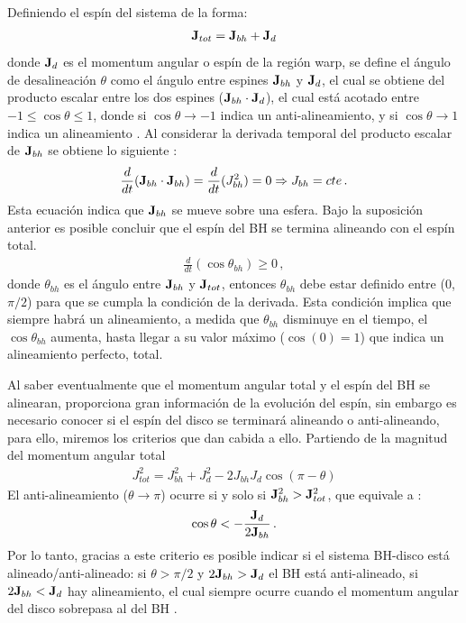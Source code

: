 Definiendo el espín del sistema de la forma:
\begin{align}
	{\bf{J}}_{tot}= {\bf{J}}_{bh}+{\bf{J}}_{d}
\end{align}
donde ${\bf{J}}_{d}$ es el momentum angular o espín de la región warp, se define el ángulo de desalineación $\theta$ como el ángulo entre espines ${\bf{J}}_{bh}$ y ${\bf{J}}_{d}$, el cual se obtiene del producto escalar entre los dos espines (${\bf{J}}_{bh} \cdot {\bf{J}}_{d}$), el cual está acotado entre $-1\leq \cos\theta \leq 1$,  donde si $\cos \theta \to -1$ indica un anti-alineamiento, y si $\cos \theta \to 1$ indica un alineamiento \cite{king2005}. Al considerar la derivada temporal del producto escalar de  ${\bf{J}}_{bh}$ se obtiene lo siguiente \cite{king2005}:
%
\begin{align}
    \frac{d }{dt}({\bf{J}}_{bh}\cdot {\bf{J}}_{bh})=  \frac{d}{dt}(J_{bh}^{2})= 0 \Rightarrow J_{bh}=cte\,.
\end{align}
%
Esta ecuación indica que ${\bf{J}}_{bh}$ se mueve sobre una esfera. Bajo la suposición anterior es posible concluir que el espín del BH se termina alineando con el espín total. 
%
\begin{align}
    \frac{d}{dt}(\cos\theta_{bh})\geq 0\,,
\end{align}
%
donde $\theta_{bh}$ es el ángulo entre ${\bf{J}}_{bh}$ y ${\bf{J}}_{tot}$, entonces $\theta_{bh}$ debe estar definido entre (0,$\pi/2$) para que se cumpla la condición de la derivada. Esta condición implica que siempre habrá un alineamiento, a medida que $\theta_{bh}$ disminuye en el tiempo, el $\cos\theta_{bh}$ aumenta, hasta llegar a su valor máximo ($\cos( 0)=1$) que indica un alineamiento perfecto, total.%

Al saber eventualmente que el momentum angular total y el espín del BH se alinearan, proporciona gran información de la evolución del espín, sin embargo es necesario conocer si el espín del disco se terminará alineando o anti-alineando, para ello, miremos los criterios que dan cabida a ello. Partiendo de la magnitud del momentum angular total
%
\begin{align}
    J^{2}_{tot} = J^{2}_{bh}+J_{d}^{2} -2J_{bh}J_{d}\cos(\pi -\theta)
\end{align}
%
El anti-alineamiento ($\theta\to\pi$) ocurre si y solo si ${\bf{J}}_{bh}^{2}>{\bf{J}}_{tot}^{2}$, que equivale a \cite{king2005}:
%
\begin{align}
    \cos\theta < - \frac{{\bf{J}}_{d}}{2{\bf{J}}_{bh}}\,.   
\end{align}
%
Por lo tanto, gracias a este criterio es posible indicar si el sistema BH-disco está alineado/anti-alineado: si $\theta >\pi/2$ y $2{\bf{J}}_{bh}>{\bf{J}}_{d}$ el BH está anti-alineado, si  $2{\bf{J}}_{bh}<{\bf{J}}_{d}$ hay alineamiento, el cual siempre ocurre cuando el momentum angular del disco sobrepasa al del BH \cite{king2005}.

